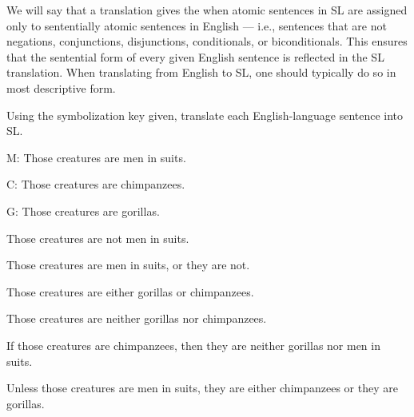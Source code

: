 We will say that a translation gives the  when atomic sentences in SL are assigned only to sententially atomic sentences in English --- i.e., sentences that are not negations, conjunctions, disjunctions, conditionals, or biconditionals. This ensures that the sentential form of every given English sentence is reflected in the SL translation. When translating from English to SL, one should typically do so in most descriptive form.

\practiceproblems

\solutions
\problempart Using the symbolization key given, translate each English-language sentence into SL.
\label{pr.monkeysuits}
\begin{ekey}
\item[M:] Those creatures are men in suits. 
\item[C:] Those creatures are chimpanzees. 
\item[G:] Those creatures are gorillas.
\end{ekey}
\begin{earg}
\item Those creatures are not men in suits.
\item Those creatures are men in suits, or they are not.
\item Those creatures are either gorillas or chimpanzees.
\item Those creatures are neither gorillas nor chimpanzees.
\item If those creatures are chimpanzees, then they are neither gorillas nor men in suits.
\item Unless those creatures are men in suits, they are either chimpanzees or they are gorillas.
\end{earg}


